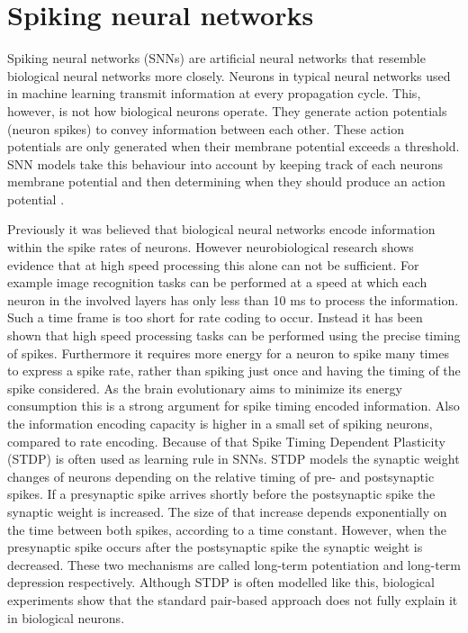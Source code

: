 \section{Spiking neural networks}

Spiking neural networks (SNNs) are artificial neural networks that resemble biological neural networks more closely. Neurons in typical neural networks used in machine learning transmit information at every propagation cycle. This, however, is not how biological neurons operate. They generate action potentials (neuron spikes) to convey information between each other. These action potentials are only generated when their membrane potential exceeds a threshold. SNN models take this behaviour into account by keeping track of each neurons membrane potential and then determining when they should produce an action potential  \citep{SpikingNeuronModelsBook}.

Previously it was believed that biological neural networks encode information within the spike rates of neurons. However neurobiological research shows evidence that at high speed processing this alone can not be sufficient. For example image recognition tasks can be performed at a speed at which each neuron in the involved layers has only less than 10 ms to process the information. Such a time frame is too short for rate coding to occur. Instead it has been shown that high speed processing tasks can be performed using the precise timing of spikes. Furthermore it requires more energy for a neuron to spike many times to express a spike rate, rather than spiking just once and having the timing of the spike considered. As the brain evolutionary aims to minimize its energy consumption this is a strong argument for spike timing encoded information. Also the information encoding capacity is higher in a small set of spiking neurons, compared to rate encoding. \citep{LearningInBiologicallyPlausibleSNN}
Because of that Spike Timing Dependent Plasticity (STDP) is often used as learning rule in SNNs. STDP models the synaptic weight changes of neurons depending on the relative timing of pre- and postsynaptic spikes. If a presynaptic spike arrives shortly before the postsynaptic spike the synaptic weight is increased. The size of that increase depends exponentially on the time between both spikes, according to a time constant. However, when the presynaptic spike occurs after the postsynaptic spike the synaptic weight is decreased. These two mechanisms are called long-term potentiation and long-term depression respectively. Although STDP is often modelled like this, biological experiments show that the standard pair-based approach does not fully explain it in biological neurons. 
\citep{LearningInBiologicallyPlausibleSNN}	

